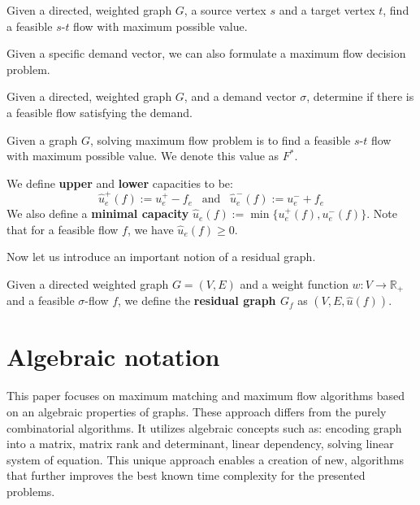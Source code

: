 \begin{problem}\label{max_flow_problem}
Given a directed, weighted graph $G$, a source vertex $s$ and a target vertex $t$, find a feasible $s$-$t$ flow with maximum possible value.
\end{problem}

Given a specific demand vector, we can also formulate a maximum flow decision problem.
\begin{problem}
Given a directed, weighted graph $G$, and a demand vector $\sigma$, determine if there is a feasible flow satisfying the demand.
\end{problem}


Given a graph $G$, solving maximum flow problem is to find a feasible $s$-$t$ flow with maximum possible value. We denote this value as $F^*$.

\begin{definition}
We define \textbf{upper} and \textbf{lower} capacities to be:
\[ \hat u_e^+(f) := u_e^+-f_e \hspace{10pt} \text{and} \hspace{10pt} \hat u_e^-(f) := u_e^-+f_e \]
We also define a \textbf{minimal capacity} $\hat u_e(f) := \min\{u_e^+(f),u_e^-(f)\}$. Note that for a feasible flow $f$, we have $\hat u_e(f) \ge 0$.
\end{definition}

Now let us introduce an important notion of a residual graph.
\begin{definition}
Given a directed weighted graph $G=(V,E)$ and a weight function $w: V \rightarrow \mathbb{R}_+$ and a feasible $\sigma$-flow $f$, we define the \textbf{residual graph $G_f$} as $(V,E,\hat u(f))$. 
\end{definition}

\section{Algebraic notation}
This paper focuses on maximum matching and maximum flow algorithms based on an algebraic properties of graphs. These approach differs from the purely combinatorial algorithms. It utilizes algebraic concepts such as: encoding graph into a matrix, matrix rank and determinant, linear dependency, solving linear system of equation. This unique approach enables a creation of new, algorithms that further improves the best known time complexity for the presented problems.


